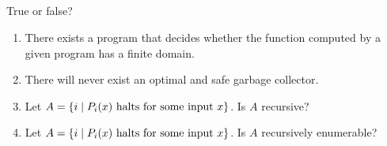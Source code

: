 \subsection{} %
True or false?
\begin{enumerate}
	\item There exists a \java{} program that decides whether
	the function computed by a given program has a finite domain.
	\item There will never exist
	an optimal and safe \java{} garbage collector.
	\item Let \(A = \{i\mid P_i(x) \textnormal{ halts for some input }x\}\).
	Is \(A\) recursive?
	\item Let \(A = \{i\mid P_i(x) \textnormal{ halts for some input }x\}\).
	Is \(A\) recursively enumerable?
\end{enumerate}
